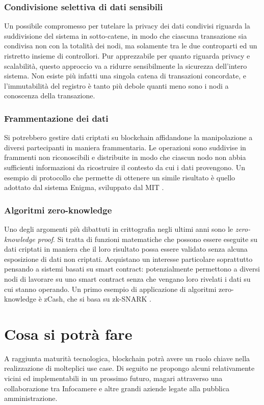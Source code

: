         \subsubsection{Condivisione selettiva di dati sensibili}
            Un possibile compromesso per tutelare la privacy dei dati condivisi riguarda la suddivisione del sistema in sotto-catene, in modo che ciascuna transazione sia condivisa non con la totalità dei nodi, ma solamente tra le due controparti ed un ristretto insieme di controllori. Pur apprezzabile per quanto riguarda privacy e scalabilità, questo approccio va a ridurre sensibilmente la sicurezza dell'intero sistema. Non esiste più infatti una singola catena di transazioni concordate, e l'immutabilità del registro è tanto più debole quanti meno sono i nodi a conoscenza della transazione.
            
        \subsubsection{Frammentazione dei dati}
            Si potrebbero gestire dati criptati su blockchain affidandone la manipolazione a diversi partecipanti in maniera frammentaria. Le operazioni sono suddivise in frammenti non riconoscibili e distribuite in modo che ciascun nodo non abbia sufficienti informazioni da ricostruire il contesto da cui i dati provengono. Un esempio di protocollo che permette di ottenere un simile risultato è quello adottato dal sistema Enigma, sviluppato dal MIT \cite{enigma}.
            
        \subsubsection{Algoritmi zero-knowledge}
            Uno degli argomenti più dibattuti in crittografia negli ultimi anni sono le \emph{zero-knowledge proof}. Si tratta di funzioni matematiche che possono essere eseguite su dati criptati in maniera che il loro risultato possa essere validato senza alcuna esposizione di dati non criptati. Acquistano un interesse particolare soprattutto pensando a sistemi basati su smart contract: potenzialmente permettono a diversi nodi di lavorare su uno smart contract senza che vengano loro rivelati i dati su cui stanno operando. Un primo esempio di applicazione di algoritmi zero-knowledge è zCash, che si basa su zk-SNARK \cite{zkSNARK}.

\section{Cosa si potrà fare}
	A raggiunta maturità tecnologica, blockchain potrà avere un ruolo chiave nella realizzazione di molteplici use case. Di seguito ne propongo alcuni relativamente vicini ed implementabili in un prossimo futuro, magari attraverso una collaborazione tra Infocamere e altre grandi aziende legate alla pubblica amministrazione.
		
